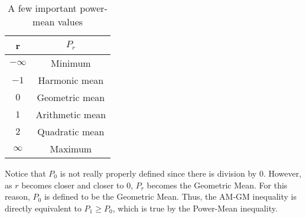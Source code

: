 \documentclass[a4paper,12pt]{article}
\begin{document}
\begin{table}[ht]
    \caption{A few important power-mean values}
    \centering
\begin{tabular}{|c|c|}
\hline
r                         & $P_r$            \\
\hline
$-\infty$                 & Minimum         \\
\hline
$-1$                      & Harmonic mean   \\
\hline
$0$                       & Geometric mean  \\
\hline
$1$                       & Arithmetic mean \\
\hline
$2$                       & Quadratic mean  \\
\hline
$\infty$                  & Maximum \\
\hline       
\end{tabular}
\end{table}

Notice that $P_0$ is not really properly defined since there is division by $0$. However, as $r$ becomes closer and closer to $0$, $P_r$ becomes the Geometric Mean. For this reason, $P_0$ is defined to be the Geometric Mean. Thus, the AM-GM inequality is directly equivalent to $P_1 \geq P_0$, which is true by the Power-Mean inequality.
\end{document}
